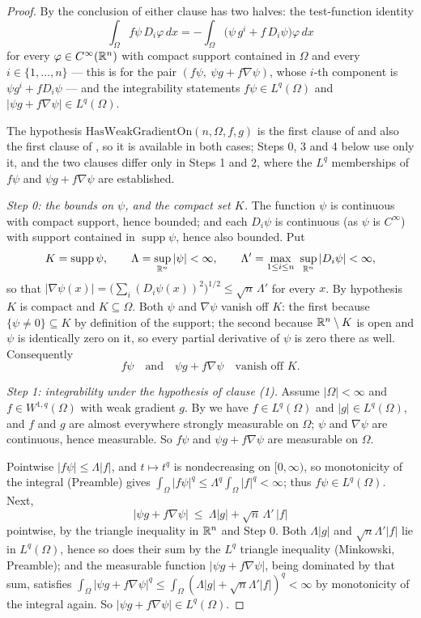 \begin{proof}
By  the conclusion of either clause has two halves: the
test-function identity
\[
\int_\Omega f\psi\,D_i\varphi\,dx
=-\int_\Omega\bigl(\psi\,g^i+f\,D_i\psi\bigr)\varphi\,dx
\tag{1}
\]
for every $\varphi\in C^\infty(\mathbb{R}^n)$ with compact support contained in
$\Omega$ and every $i\in\{1,\dots,n\}$ --- this is
 for the pair $(f\psi,\ \psi g+f\nabla\psi)$, whose
$i$-th component is $\psi g^i+fD_i\psi$ --- and the integrability statements
$f\psi\in L^q(\Omega)$ and $|\psi g+f\nabla\psi|\in L^q(\Omega)$.

The hypothesis $\mathrm{HasWeakGradientOn}(n,\Omega,f,g)$ is the first clause
of  and also the first clause of , so it
is available in both cases; Steps 0, 3 and 4 below use only it, and the two
clauses differ only in Steps 1 and 2, where the $L^q$ memberships of
$f\psi$ and $\psi g+f\nabla\psi$ are established.

\emph{Step 0: the bounds on $\psi$, and the compact set $K$.}  The function
$\psi$ is continuous with compact support, hence bounded; and each $D_i\psi$ is
continuous (as $\psi$ is $C^\infty$) with support contained in
$\operatorname{supp}\psi$, hence also bounded.  Put
\[
K=\operatorname{supp}\psi,
\qquad
\Lambda=\sup_{\mathbb{R}^n}|\psi|<\infty,
\qquad
\Lambda'=\max_{1\le i\le n}\ \sup_{\mathbb{R}^n}|D_i\psi|<\infty ,
\]
so that $|\nabla\psi(x)|=\bigl(\sum_i(D_i\psi(x))^2\bigr)^{1/2}\le\sqrt n\,\Lambda'$
for every $x$.  By hypothesis $K$ is compact and $K\subseteq\Omega$.  Both
$\psi$ and $\nabla\psi$ vanish off $K$: the first because
$\{\psi\ne0\}\subseteq K$ by definition of the support; the second because
$\mathbb{R}^n\setminus K$ is open and $\psi$ is identically zero on it, so every
partial derivative of $\psi$ is zero there as well.  Consequently
\[
f\psi\quad\text{and}\quad \psi g+f\nabla\psi\quad\text{vanish off }K .
\tag{2}
\]

\emph{Step 1: integrability under the hypothesis of clause (1).}  Assume
$|\Omega|<\infty$ and $f\in W^{1,q}(\Omega)$ with weak gradient $g$.  By
 we have $f\in L^q(\Omega)$ and $|g|\in L^q(\Omega)$, and $f$
and $g$ are almost everywhere strongly measurable on $\Omega$; $\psi$ and
$\nabla\psi$ are continuous, hence measurable.  So $f\psi$ and
$\psi g+f\nabla\psi$ are measurable on $\Omega$.

Pointwise $|f\psi|\le\Lambda|f|$, and $t\mapsto t^q$ is nondecreasing on
$[0,\infty)$, so monotonicity of the integral (Preamble) gives
$\int_\Omega|f\psi|^q\le\Lambda^q\int_\Omega|f|^q<\infty$; thus
$f\psi\in L^q(\Omega)$.  Next,
\[
|\psi g+f\nabla\psi|\ \le\ \Lambda|g|+\sqrt n\,\Lambda'\,|f|
\tag{3}
\]
pointwise, by the triangle inequality in $\mathbb{R}^n$ and Step 0.  Both
$\Lambda|g|$ and $\sqrt n\Lambda'|f|$ lie in $L^q(\Omega)$, hence so does their
sum by the $L^q$ triangle inequality (Minkowski, Preamble); and the measurable
function $|\psi g+f\nabla\psi|$, being dominated by that sum, satisfies
$\int_\Omega|\psi g+f\nabla\psi|^q\le\int_\Omega(\Lambda|g|+\sqrt n\Lambda'|f|)^q<\infty$
by monotonicity of the integral again.  So
$|\psi g+f\nabla\psi|\in L^q(\Omega)$.


\end{proof}
